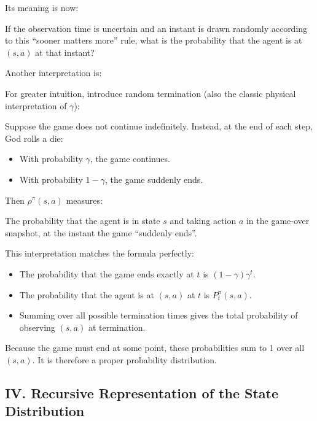 Its meaning is now:

If the observation time is uncertain and an instant is drawn randomly according to this ``sooner matters more'' rule, what is the probability that the agent is at \((s,a)\) at that instant?

Another interpretation is:

For greater intuition, introduce random termination (also the classic physical interpretation of \(\gamma\)):

Suppose the game does not continue indefinitely. Instead, at the end of each step, God rolls a die:

\begin{itemize}
\tightlist
\item
  With probability \(\gamma\), the game continues.
\item
  With probability \(1-\gamma\), the game suddenly ends.
\end{itemize}

Then \(\rho^\pi(s,a)\) measures:

The probability that the agent is in state \(s\) and taking action \(a\) in the game-over snapshot, at the instant the game ``suddenly ends''.

This interpretation matches the formula perfectly:

\begin{itemize}
\tightlist
\item
  The probability that the game ends exactly at \(t\) is \((1-\gamma)\gamma^t\).
\item
  The probability that the agent is at \((s,a)\) at \(t\) is \(P_t^\pi(s,a)\).
\item
  Summing over all possible termination times gives the total probability of observing \((s,a)\) at termination.
\end{itemize}

Because the game must end at some point, these probabilities sum to 1 over all \((s,a)\). It is therefore a proper probability distribution.

\hypertarget{iv.-recursive-representation-of-the-state-distribution}{%
\subsection{IV. Recursive Representation of the State Distribution}\label{iv.-recursive-representation-of-the-state-distribution}}

